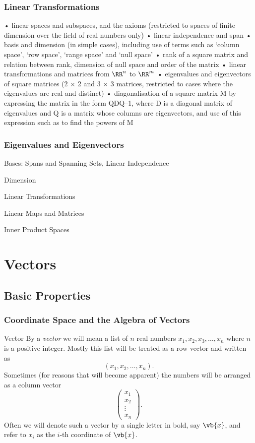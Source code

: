 


\subsection{Linear Transformations}
• linear spaces and subspaces, and the axioms (restricted to spaces of finite dimension over the field of real numbers only)
• linear independence and span
• basis and dimension (in simple cases), including use of terms such as ‘column space', ‘row space', ‘range space' and ‘null space'
• rank of a square matrix and relation between rank, dimension of null space and order of the matrix
• linear transformations and matrices from $\RR^n$ to $\RR^m$
• eigenvalues and eigenvectors of square matrices (2 × 2 and 3 × 3 matrices, restricted to cases where the eigenvalues are real and distinct)
• diagonalisation of a square matrix M by expressing the matrix in the form QDQ–1, where D is a diagonal matrix of eigenvalues and Q is a matrix whose columns are eigenvectors, and use of this expression such as to find the powers of M 

\subsection{Eigenvalues and Eigenvectors}

\pagebreak

Bases: Spans and Spanning Sets, Linear Independence

Dimension

Linear Transformations

Linear Maps and Matrices

Inner Product Spaces

\chapter{Vectors}
\section{Basic Properties}
\subsection{Coordinate Space and the Algebra of Vectors}
\begin{defn}{Vector}{}
By a \emph{vector} we will mean a list of $n$ real numbers $x_1,x_2,x_3,\dots,x_n$ where $n$ is a positive integer. Mostly this list will be treated as a row vector and written as
\[ (x_1,x_2,\dots,x_n). \]
Sometimes (for reasons that will become apparent) the numbers will be arranged as a column vector
\[ \begin{pmatrix} x_1\\x_2\\\vdots\\x_n \end{pmatrix}. \]
Often we will denote such a vector by a single letter in bold, say $\vb{x}$, and refer to $x_i$ as the $i$-th coordinate of $\vb{x}$.
\end{defn}

